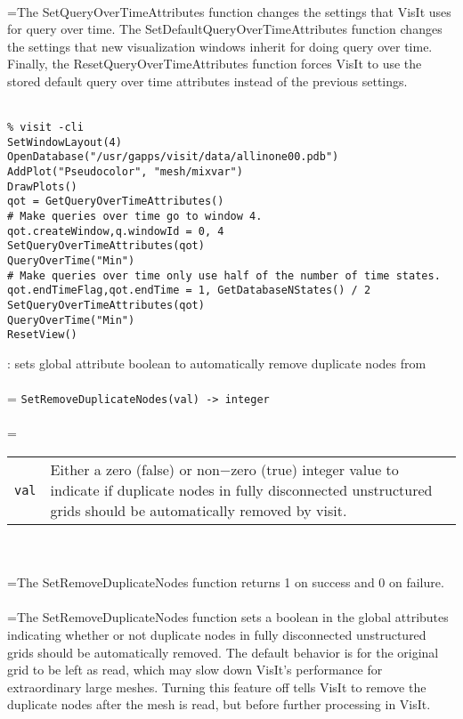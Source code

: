\documentclass[10pt,a4paper]{report}
\begin{document}
 \\ 
\hangindent=\parindent The SetQueryOverTimeAttributes function changes the settings that VisIt uses for query over time. The SetDefaultQueryOverTimeAttributes function changes the settings that new visualization windows inherit for doing query over time. Finally, the ResetQueryOverTimeAttributes function forces VisIt to use the stored default query over time attributes instead of the previous settings. \\[-3mm] 

\\[-6mm]
\begin{verbatim}% visit -cli
SetWindowLayout(4)
OpenDatabase("/usr/gapps/visit/data/allinone00.pdb")
AddPlot("Pseudocolor", "mesh/mixvar")
DrawPlots()
qot = GetQueryOverTimeAttributes()
# Make queries over time go to window 4.
qot.createWindow,q.windowId = 0, 4
SetQueryOverTimeAttributes(qot)
QueryOverTime("Min")
# Make queries over time only use half of the number of time states.
qot.endTimeFlag,qot.endTime = 1, GetDatabaseNStates() / 2
SetQueryOverTimeAttributes(qot)
QueryOverTime("Min")
ResetView()
\end{verbatim}
\newpage


{}
: sets global attribute boolean to automatically remove duplicate nodes from\\[-3mm]

 \\ 
\hangindent=\parindent 
\verb!SetRemoveDuplicateNodes(val) -> integer!\\ [-3mm]

 \\ 
\hangindent=\parindent 
\begin{tabular}{lp{9cm}}
\verb!val! & Either a zero (false) or non$-$zero (true) integer value to indicate if duplicate nodes in fully disconnected unstructured grids should be  automatically removed by visit. \\
\end{tabular} \\[-2mm]


 \\ 
\hangindent=\parindent The SetRemoveDuplicateNodes function returns 1 on success and 0 on failure. \\[-3mm] 

 \\ 
\hangindent=\parindent The SetRemoveDuplicateNodes function sets a boolean in the  global attributes indicating whether or not duplicate nodes in fully disconnected unstructured grids should be automatically removed. The default behavior is for the original grid to be left as read, which may slow down VisIt's performance for extraordinary large meshes. Turning this feature off tells VisIt to remove the duplicate nodes after the mesh is read, but before further processing in VisIt. \\[-3mm] 
\end{document}
